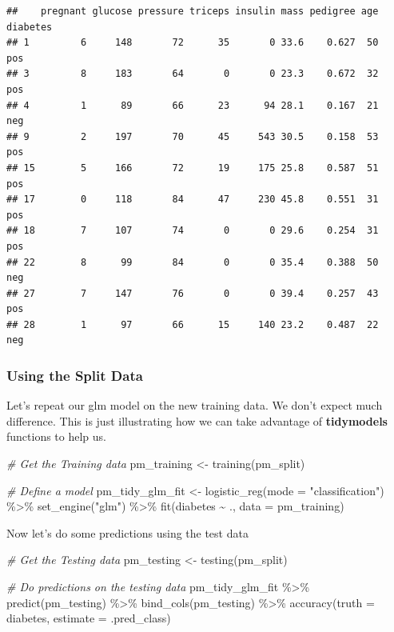 \documentclass[
]{article}
\newenvironment{Shaded}{\begin{snugshade}}{\end{snugshade}}
\newcommand{\AttributeTok}[1]{\textcolor[rgb]{0.77,0.63,0.00}{#1}}
\newcommand{\CommentTok}[1]{\textcolor[rgb]{0.56,0.35,0.01}{\textit{#1}}}
\newcommand{\FunctionTok}[1]{\textcolor[rgb]{0.00,0.00,0.00}{#1}}
\newcommand{\NormalTok}[1]{#1}
\newcommand{\OtherTok}[1]{\textcolor[rgb]{0.56,0.35,0.01}{#1}}
\newcommand{\SpecialCharTok}[1]{\textcolor[rgb]{0.00,0.00,0.00}{#1}}
\newcommand{\StringTok}[1]{\textcolor[rgb]{0.31,0.60,0.02}{#1}}
\begin{document}
\begin{verbatim}
##    pregnant glucose pressure triceps insulin mass pedigree age diabetes
## 1         6     148       72      35       0 33.6    0.627  50      pos
## 3         8     183       64       0       0 23.3    0.672  32      pos
## 4         1      89       66      23      94 28.1    0.167  21      neg
## 9         2     197       70      45     543 30.5    0.158  53      pos
## 15        5     166       72      19     175 25.8    0.587  51      pos
## 17        0     118       84      47     230 45.8    0.551  31      pos
## 18        7     107       74       0       0 29.6    0.254  31      pos
## 22        8      99       84       0       0 35.4    0.388  50      neg
## 27        7     147       76       0       0 39.4    0.257  43      pos
## 28        1      97       66      15     140 23.2    0.487  22      neg
\end{verbatim}

\hypertarget{using-the-split-data}{%
\subsubsection{Using the Split Data}\label{using-the-split-data}}

Let's repeat our glm model on the new training data. We don't expect
much difference. This is just illustrating how we can take advantage of
\textbf{tidymodels} functions to help us.

\begin{Shaded}
\begin{Highlighting}[]
\CommentTok{\# Get the Training data}
\NormalTok{pm\_training }\OtherTok{\textless{}{-}} \FunctionTok{training}\NormalTok{(pm\_split)}

\CommentTok{\# Define a model}
\NormalTok{pm\_tidy\_glm\_fit }\OtherTok{\textless{}{-}} \FunctionTok{logistic\_reg}\NormalTok{(}\AttributeTok{mode =} \StringTok{"classification"}\NormalTok{) }\SpecialCharTok{\%\textgreater{}\%}
  \FunctionTok{set\_engine}\NormalTok{(}\StringTok{"glm"}\NormalTok{) }\SpecialCharTok{\%\textgreater{}\%}
  \FunctionTok{fit}\NormalTok{(diabetes }\SpecialCharTok{\textasciitilde{}}\NormalTok{ ., }\AttributeTok{data =}\NormalTok{ pm\_training)}
\end{Highlighting}
\end{Shaded}

Now let's do some predictions using the test data

\begin{Shaded}
\begin{Highlighting}[]
\CommentTok{\# Get the Testing data}
\NormalTok{pm\_testing }\OtherTok{\textless{}{-}} \FunctionTok{testing}\NormalTok{(pm\_split)}

\CommentTok{\# Do predictions on the testing data}
\NormalTok{pm\_tidy\_glm\_fit }\SpecialCharTok{\%\textgreater{}\%}
  \FunctionTok{predict}\NormalTok{(pm\_testing) }\SpecialCharTok{\%\textgreater{}\%}
  \FunctionTok{bind\_cols}\NormalTok{(pm\_testing) }\SpecialCharTok{\%\textgreater{}\%}
  \FunctionTok{accuracy}\NormalTok{(}\AttributeTok{truth =}\NormalTok{ diabetes, }\AttributeTok{estimate =}\NormalTok{ .pred\_class)}
\end{Highlighting}
\end{Shaded}
\end{document}
